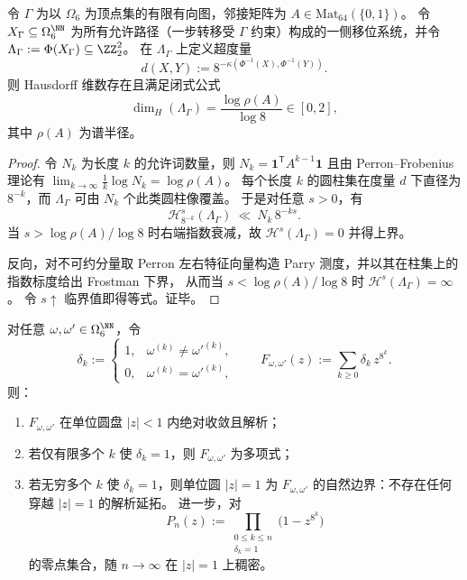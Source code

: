 \begin{theorem}\label{thm:conclusion-window6-sft-2adic-dimension-spectral-radius}
令 \(\Gamma\) 为以 \(\Omega_6\) 为顶点集的有限有向图，邻接矩阵为 \(A\in\mathrm{Mat}_{64}(\{0,1\})\)。
令 \(X_\Gamma\subseteq\Omega_6^{\NN}\) 为所有允许路径（一步转移受 \(\Gamma\) 约束）构成的一侧移位系统，并令
\(
\Lambda_\Gamma:=\Phi(X_\Gamma)\subseteq \ZZ_2^2
\)。
在 \(\Lambda_\Gamma\) 上定义超度量
\[
d(X,Y):=8^{-\kappa(\Phi^{-1}(X),\Phi^{-1}(Y))}.
\]
则 Hausdorff 维数存在且满足闭式公式
\[
\dim_H(\Lambda_\Gamma)=\frac{\log\rho(A)}{\log 8}\in[0,2],
\]
其中 \(\rho(A)\) 为谱半径。
\end{theorem}

\begin{proof}
令 \(N_k\) 为长度 \(k\) 的允许词数量，则
\(
N_k=\mathbf 1^{\mathsf T}A^{k-1}\mathbf 1
\)
且由 Perron--Frobenius 理论有 \(\lim_{k\to\infty}\frac1k\log N_k=\log\rho(A)\)。
每个长度 \(k\) 的圆柱集在度量 \(d\) 下直径为 \(8^{-k}\)，而 \(\Lambda_\Gamma\) 可由 \(N_k\) 个此类圆柱像覆盖。
于是对任意 \(s>0\)，有
\[
\mathcal H^s_{8^{-k}}(\Lambda_\Gamma)\ \ll\ N_k\,8^{-ks}.
\]
当 \(s>\log\rho(A)/\log 8\) 时右端指数衰减，故 \(\mathcal H^s(\Lambda_\Gamma)=0\) 并得上界。
\par
反向，对不可约分量取 Perron 左右特征向量构造 Parry 测度，并以其在柱集上的指数标度给出 Frostman 下界，
从而当 \(s<\log\rho(A)/\log 8\) 时 \(\mathcal H^s(\Lambda_\Gamma)=\infty\)。
令 \(s\uparrow\) 临界值即得等式。证毕。
\end{proof}

\begin{theorem}\label{thm:conclusion-window6-gap-series-natural-boundary}
对任意 \(\omega,\omega'\in\Omega_6^{\NN}\)，令
\[
\delta_k:=
\begin{cases}
1,&\omega^{(k)}\neq\omega'^{(k)},\\
0,&\omega^{(k)}=\omega'^{(k)},
\end{cases}
\qquad
F_{\omega,\omega'}(z):=\sum_{k\ge 0}\delta_k\,z^{8^k}.
\]
则：
\begin{enumerate}
  \item \(F_{\omega,\omega'}\) 在单位圆盘 \(|z|<1\) 内绝对收敛且解析；
  \item 若仅有限多个 \(k\) 使 \(\delta_k=1\)，则 \(F_{\omega,\omega'}\) 为多项式；
  \item 若无穷多个 \(k\) 使 \(\delta_k=1\)，则单位圆 \(|z|=1\) 为 \(F_{\omega,\omega'}\) 的自然边界：不存在任何穿越 \(|z|=1\) 的解析延拓。
  进一步，对
  \[
  P_n(z):=\prod_{\substack{0\le k\le n\\ \delta_k=1}}\bigl(1-z^{8^k}\bigr)
  \]
  的零点集合，随 \(n\to\infty\) 在 \(|z|=1\) 上稠密。
\end{enumerate}
\end{theorem}

